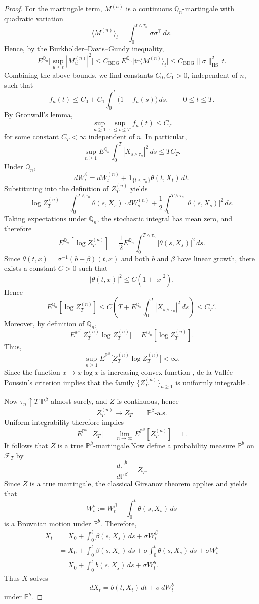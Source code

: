 \documentclass[twoside,11pt]{article}
\numberwithin{equation}{section}
\begin{document}
\begin{proof}
For the martingale term, $M^{(n)}$ is a continuous $\mathbb{Q}_n$-martingale with quadratic variation
\[
\langle M^{(n)}\rangle_t
=
\int_0^{t\wedge\tau_n}\sigma\sigma^\top\,ds.
\]
Hence, by the Burkholder--Davis--Gundy inequality\citep{karatzas2014brownian},
\[
E^{\mathbb{Q}_n}\Big[\sup_{u\le t}|M_u^{(n)}|^2\Big]
\le C_{\mathrm{BDG}}\,E^{\mathbb{Q}_n}\big[\mathrm{tr}\langle M^{(n)}\rangle_t\big]
\le C_{\mathrm{BDG}}\|\sigma\|_{\mathrm{HS}}^2\,t.
\]
Combining the above bounds, we find constants $C_0,C_1>0$, independent of $n$, such that
\[
f_n(t)\le C_0+C_1\int_0^t \bigl(1+f_n(s)\bigr)\,ds,\qquad 0\le t\le T.
\]
By Gronwall's lemma,
\[
\sup_{n\ge 1}\sup_{0\le t\le T} f_n(t)\le C_T
\]
for some constant $C_T<\infty$ independent of $n$. In particular,
\[
\sup_{n\ge 1}E^{\mathbb{Q}_n}\int_0^T |X_{s\wedge\tau_n}|^2\,ds
\le T C_T.
\]
Under $\mathbb{Q}_n$,
\[
dW_t^\beta=dW_t^{(n)}+\mathbf 1_{\{t\le \tau_n\}}\theta(t,X_t)\,dt.
\]
Substituting into the definition of $Z_T^{(n)}$ yields
\[
\log Z_T^{(n)}
=
\int_0^{T\wedge\tau_n}\theta(s,X_s)\cdot dW_s^{(n)}
+\frac12\int_0^{T\wedge\tau_n}|\theta(s,X_s)|^2\,ds.
\]
Taking expectations under $\mathbb{Q}_n$, the stochastic integral has mean zero, and therefore
\[
E^{\mathbb{Q}_n}[\log Z_T^{(n)}]
=
\frac12E^{\mathbb{Q}_n}\int_0^{T\wedge\tau_n}|\theta(s,X_s)|^2\,ds.
\]
Since $\theta(t,x)=\sigma^{-1}(b-\beta)(t,x)$ and both $b$ and $\beta$ have linear growth, there exists a constant $C>0$ such that
\[
|\theta(t,x)|^2\le C(1+|x|^2).
\]
Hence
\[
E^{\mathbb{Q}_n}[\log Z_T^{(n)}]
\le C\left(T+E^{\mathbb{Q}_n}\int_0^T |X_{s\wedge\tau_n}|^2\,ds\right)
\le C_T'.
\]
Moreover, by definition of $\mathbb{Q}_n$,
\[
E^{\mathbb{P}^\beta}\big[Z_T^{(n)}\log Z_T^{(n)}\big]
=
E^{\mathbb{Q}_n}[\log Z_T^{(n)}].
\]
Thus,
\[
\sup_{n\ge 1}E^{\mathbb{P}^\beta}\big[Z_T^{(n)}\log Z_T^{(n)}\big]<\infty.
\]
Since the function $x\mapsto x\log x$ is increasing convex function  , de la Vallée-Poussin's criterion implies that the family $\{Z_T^{(n)}\}_{n\ge 1}$ is uniformly integrable \citep{durrett2019probability}.

Now $\tau_n\uparrow T$ $\mathbb{P}^\beta$-almost surely, and $Z$ is continuous, hence
\[
Z_T^{(n)}\to Z_T
\qquad \mathbb{P}^\beta\text{-a.s.}
\]
Uniform integrability therefore implies
\[
E^{\mathbb{P}^\beta}[Z_T]
=
\lim_{n\to\infty}E^{\mathbb{P}^\beta}[Z_T^{(n)}]
=
1.
\]
It follows that $Z$ is a true $\mathbb{P}^\beta$-martingale.Now define a probability measure $\mathbb{P}^b$ on $\mathcal F_T$ by
\[
\frac{d\mathbb{P}^b}{d\mathbb{P}^\beta}=Z_T.
\]
Since $Z$ is a true martingale, the classical Girsanov theorem applies and yields that
\[
W_t^b:=W_t^\beta-\int_0^t \theta(s,X_s)\,ds
\]
is a Brownian motion under $\mathbb{P}^b$. Therefore,
\begin{align*}
X_t
&=X_0+\int_0^t \beta(s,X_s)\,ds+\sigma W_t^\beta\\
&=X_0+\int_0^t \beta(s,X_s)\,ds
+\sigma\int_0^t \theta(s,X_s)\,ds
+\sigma W_t^b\\
&=X_0+\int_0^t b(s,X_s)\,ds+\sigma W_t^b.
\end{align*}
Thus $X$ solves
\[
dX_t=b(t,X_t)\,dt+\sigma\,dW_t^b
\]
under $\mathbb{P}^b$.


\end{proof}
\end{document}
